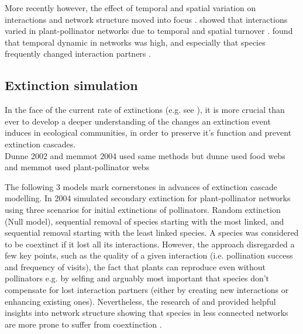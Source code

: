 \documentclass[12pt,a4paper]{article}
\begin{document}
More recently however, the effect of temporal and spatial variation on interactions and network structure moved into focus \parencite{Schwarz2020, CaraDonna2021}. \citeauthor{Olesen2008} showed that interactions varied in plant-pollinator networks due to temporal and spatial turnover \parencite{Olesen2008}. \citeauthor{CaraDonna2017} found that temporal dynamic in networks was high, and especially that species frequently changed interaction partners \parencite{CaraDonna2017}. \par




\subsection{Extinction simulation}
	In the face of the current rate of extinctions (e.g. see \cite{IPBES2019}), it is more crucial than ever to develop a deeper understanding of the changes an extinction event induces in ecological communities, in order to preserve it's function and prevent extinction cascades.\\
	
Dunne 2002 and memmot 2004 used same methods but dunne used food webs and memmot used plant-pollinator webs	
	
	 The following 3 models mark cornerstones in advances of extinction cascade modelling. In 2004 \citeauthor{Memmott2004} simulated secondary extinction for plant-pollinator networks using three scenarios for initial extinctions of pollinators. Random extinction (Null model), sequential removal of species starting with the most linked, and sequential removal starting with the least linked species. A species was considered to be coextinct if it lost all its interactions. However, the approach disregarded a few key points, such as the quality of a given interaction (i.e. pollination success and frequency of visits), the fact that plants can reproduce even without pollinators e.g. by selfing and arguably most important that species don't compensate for lost interaction partners (either by creating new interactions or enhancing existing ones). Nevertheless, the research of \citeauthor{Dunne2002} and \citeauthor{Memmott2004} provided helpful insights into network structure showing that species in less connected networks are more prone to suffer from coextinction \parencite{Memmott2004, Dunne2002}. \par
\end{document}
